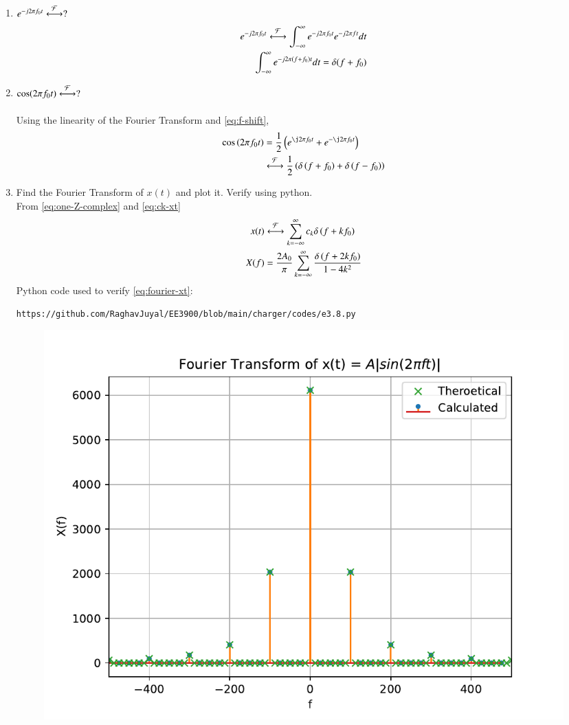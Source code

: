 \documentclass[journal,12pt,twocolumn]{IEEEtran}
\renewcommand\thesection{\arabic{section}}
\begin{document}
\begin{enumerate}[label=\thesection.\arabic*
,ref=\thesection.\theenumi]
\begin{align}
	= e^{\j 2\pi (0) t} = 1
	\label{eq:fourier-delta}
\end{align}
\item $e^{-j2\pi f_0t}\overset{\mathcal{F}}{ \longleftrightarrow}?$\\
\solution %
\begin{align}
	e^{-j2\pi f_0t}\overset{\mathcal{F}}{ \longleftrightarrow} \int_{-\infty}^{\infty} e^{-j2\pi f_0t} e^{-j2\pi ft}dt\\
	\int_{-\infty}^{\infty} e^{-j2\pi (f+f_0)t} dt
	=\delta(f+f_0)
	\label{eq:f-shift}
\end{align}
\item $\cos(2\pi f_0t)\overset{\mathcal{F}}{ \longleftrightarrow}?$\\
\solution\\
Using the linearity of the Fourier Transform and \eqref{eq:f-shift},
\begin{align}
	\cos\brak{2\pi f_0t} &= \frac{1}{2}
	\brak{e^{\j2\pi f_0t} + e^{-\j2\pi f_0t}} \nonumber \\ 
	&\system{F}\frac{1}{2}\brak{\delta\brak{f+f_0} + \delta\brak{f-f_0}}
\end{align}
 \item Find the Fourier Transform of $x(t)$ and plot it.  Verify using python.\\
 \solution From \eqref{eq:one-Z-complex} and \eqref{eq:ck-xt}
\begin{align}
 x(t)&\overset{\mathcal{F}}{ \longleftrightarrow}\sum_{k=-\infty}^{\infty}c_k\delta\left(f+kf_0\right) \\
 X(f)&=\frac{2A_0}{\pi}\sum_{k=-\infty}^{\infty}\frac{\delta\left(f+2kf_0\right)}{1-4k^2}
 \label{eq:fourier-xt}
\end{align}
Python code used to verify \eqref{eq:fourier-xt}:
\begin{lstlisting}
https://github.com/RaghavJuyal/EE3900/blob/main/charger/codes/e3.8.py
\end{lstlisting}
\begin{figure}[!ht]
	\begin{center}
		\includegraphics[width=\columnwidth]{./figs/e3.8.pdf}

\end{center}
\end{figure}
\end{enumerate}
\end{document}
